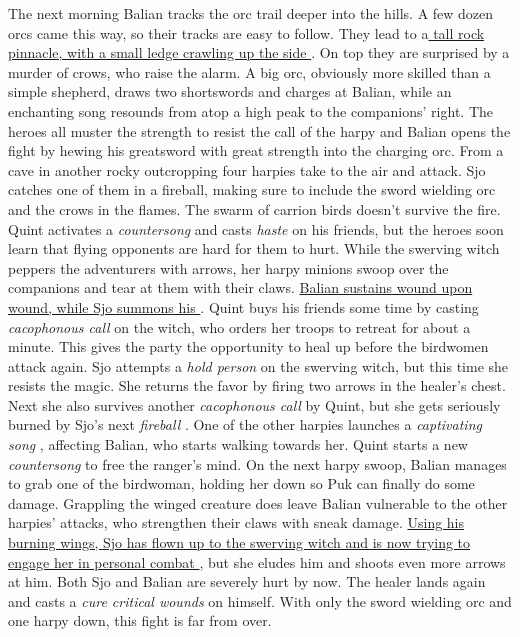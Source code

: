 The next morning Balian tracks the orc trail deeper into the hills. A few dozen orcs came this way, so their tracks are easy to follow. They lead to a\hyperref[fig:Circeis-lair-for-token-into-Urgir-587600250]{ tall rock pinnacle, with a small ledge crawling up the side } . On top they are surprised by a murder of crows, who raise the alarm. A big orc, obviously more skilled than a simple shepherd, draws two shortswords and charges at Balian, while an enchanting song resounds from atop a high peak to the companions' right. The heroes all muster the strength to resist the call of the harpy and Balian opens the fight by hewing his greatsword with great strength into the charging orc. From a cave in another rocky outcropping four harpies take to the air and attack. Sjo catches one of them in a fireball, making sure to include the sword wielding orc and the crows in the flames. The swarm of carrion birds doesn't survive the fire. Quint activates a  {\itshape countersong} and casts  {\itshape haste} on his friends, but the heroes soon learn that flying opponents are hard for them to hurt. While the swerving witch peppers the adventurers with arrows, her harpy minions swoop over the companions and tear at them with their claws. \hyperref[fig:Fighting-the-harpies-in-Circeis-lair-587601733]{ Balian sustains wound upon wound, while Sjo summons his } . Quint buys his friends some time by casting  {\itshape cacophonous call} on the witch, who orders her troops to retreat for about a minute. This gives the party the opportunity to heal up before the birdwomen attack again. Sjo attempts a  {\itshape hold person} on the swerving witch, but this time she resists the magic. She returns the favor by firing two arrows in the healer's chest. Next she also survives another  {\itshape cacophonous call} by Quint, but she gets seriously burned by Sjo's next  {\itshape fireball} . One of the other harpies launches a  {\itshape captivating song} , affecting Balian, who starts walking towards her. Quint starts a new  {\itshape countersong} to free the ranger's mind. On the next harpy swoop, Balian manages to grab one of the birdwoman, holding her down so Puk can finally do some damage. Grappling the winged creature does leave Balian vulnerable to the other harpies' attacks, who strengthen their claws with sneak damage. \hyperref[fig:Sjo-confonts-the-harpy-witch-587602339]{ Using his burning wings, Sjo has flown up to the swerving witch and is now trying to engage her in personal combat } , but she eludes him and shoots even more arrows at him. Both Sjo and Balian are severely hurt by now. The healer lands again and casts a  {\itshape cure critical wounds} on himself. With only the sword wielding orc and one harpy down, this fight is far from over. \\

